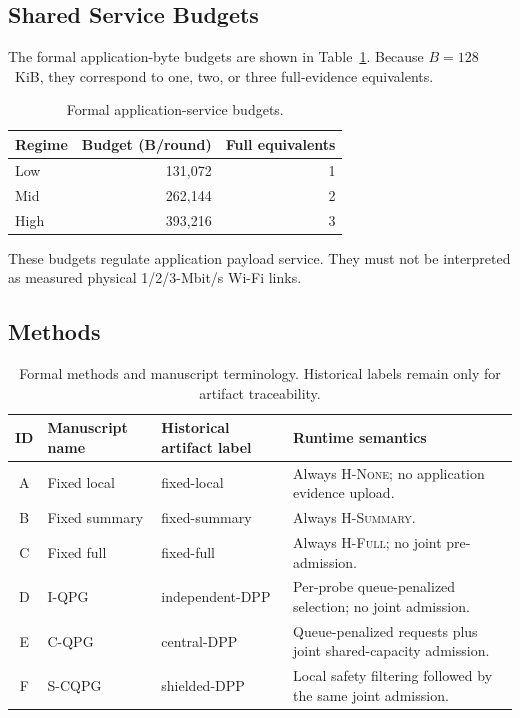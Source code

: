 \documentclass[10pt,journal]{IEEEtran}
\newcommand{\Hnone}{\textsc{H-None}}
\newcommand{\Hsummary}{\textsc{H-Summary}}
\newcommand{\Hfull}{\textsc{H-Full}}
\newcommand{\IQPG}{\textsc{I-QPG}}
\newcommand{\CQPG}{\textsc{C-QPG}}
\newcommand{\SCQPG}{\textsc{S-CQPG}}
\begin{document}
\subsection{Shared Service Budgets}

The formal application-byte budgets are shown in
Table~\ref{tab:capacity}. Because $B=128$~KiB, they correspond to one,
two, or three full-evidence equivalents.

\begin{table}[t]
\centering
\caption{Formal application-service budgets.}
\label{tab:capacity}
\small
\begin{tabular}{@{}lrr@{}}
\toprule
Regime & Budget (B/round) & Full equivalents \\
\midrule
Low  & 131,072 & 1 \\
Mid  & 262,144 & 2 \\
High & 393,216 & 3 \\
\bottomrule
\end{tabular}
\end{table}

These budgets regulate application payload service. They must not be
interpreted as measured physical 1/2/3-Mbit/s Wi-Fi links.

\subsection{Methods}

\begin{table}[t]
\centering
\caption{Formal methods and manuscript terminology. Historical labels remain
only for artifact traceability.}
\label{tab:methods}
\small
\begin{tabular}{@{}clll@{}}
\toprule
ID & Manuscript name & Historical artifact label & Runtime semantics \\
\midrule
A & Fixed local & fixed-local &
Always \Hnone; no application evidence upload. \\
B & Fixed summary & fixed-summary &
Always \Hsummary. \\
C & Fixed full & fixed-full &
Always \Hfull; no joint pre-admission. \\
D & \IQPG & independent-DPP &
Per-probe queue-penalized selection; no joint admission. \\
E & \CQPG & central-DPP &
Queue-penalized requests plus joint shared-capacity admission. \\
F & \SCQPG & shielded-DPP &
Local safety filtering followed by the same joint admission. \\
\bottomrule
\end{tabular}
\end{table}
\end{document}
